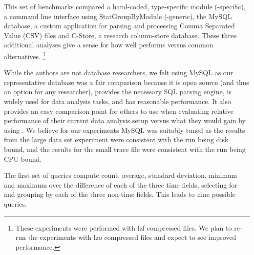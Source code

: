 This set of benchmarks compared a hand-coded, type-specific \DataSeries{}
module (\DS{}-specific), a command line \DataSeries{} interface using \DS{}StatGroupByModule (\DS{}-generic), the
MySQL database, a custom application for parsing and processing Comma
Separated Value (CSV) files and C-Store, a research column-store database.  
These three additional
analyses give a sense for how well \DataSeries{} performs versus 
common alternatives. \footnote{These experiments were performed with lzf compressed files.  We plan to re-run the experiments with lzo compressed files and expect to see improved performance.}

While the authors are not database researchers, we felt using MySQL as
our representative database was a fair comparison because it is open
source (and thus an option for any researcher), provides the necessary
SQL parsing engine, is widely used for data analysis tasks, and has
reasonable performance.  It also provides an easy comparison point for
others to use when evaluating relative performance of their current
data analysis setup versus what they would gain by using
\DataSeries{}.  We believe for our experiments MySQL was suitably
tuned as the results from the large data set experiment were consistent with
the run being disk bound, and the results for the small trace file were
consistent with the run being CPU bound.

The first set of queries compute count, average, standard deviation, minimum and
maximum over the difference of each of the three time fields,
selecting for and grouping by each of the three non-time fields.  This
leads to nine possible queries.%


